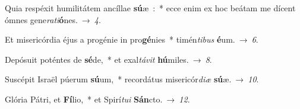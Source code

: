 ﻿\item Quia respéxit humilitátem ancíllae \textbf{sú}\-æ~:~*
ecce enim ex hoc beátam me dícent ómnes gene\emph{ra}\-\emph{ti}\-\textbf{ó}\-nes.~→~\emph{4}.
\item Et misericórdia éjus a progénie in pro\textbf{gé}\-nies~*
timén\emph{ti}\-\emph{bus} \textbf{é}\-um.~→~\emph{6}.
\item Depósuit poténtes de \textbf{sé}\-de,~*
et exal\emph{tá}\-\emph{vit} \textbf{hú}\-miles.~→~\emph{8}.
\item Suscépit Israël púerum \textbf{sú}\-um,~*
recordátus misericór\emph{di}\-\emph{æ} \textbf{sú}\-æ.~→~\emph{10}.
\item Glória Pátri, et \textbf{Fí}\-lio,~*
et Spirí\emph{tu}\-\emph{i} \textbf{Sán}\-cto.~→~\emph{12}.
